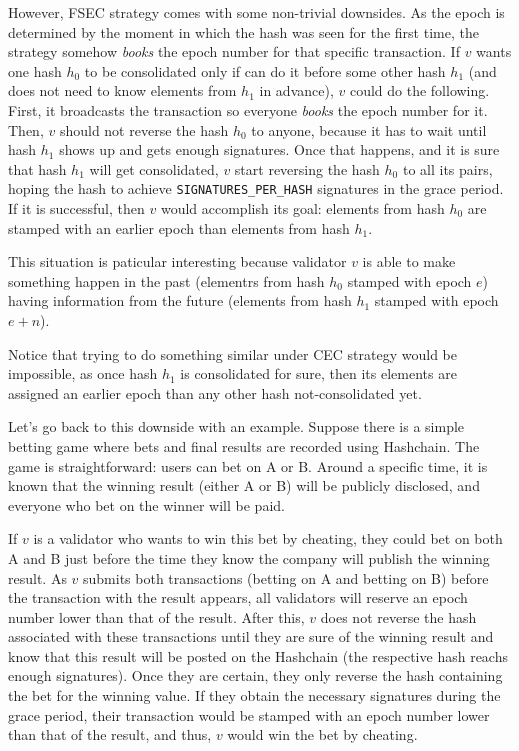 However, FSEC strategy comes with some non-trivial downsides.
As the epoch is determined by the moment in which the hash was seen for the first time,
the strategy somehow \textit{books} the epoch number for that specific transaction.
If $v$ wants one hash $h_0$ to be consolidated only if can do it before some other 
hash $h_1$ (and does not need to know elements from $h_1$ in advance),
$v$ could do the following. First, it broadcasts the transaction so
everyone \textit{books}
the epoch number for it.
Then, $v$ should not reverse the hash $h_0$ to anyone, because it has to wait until hash
$h_1$ shows up and gets enough signatures.
Once that happens, and it is sure that hash
$h_1$ will get consolidated, $v$ start reversing the hash $h_0$ to all its pairs, hoping the
hash to achieve \texttt{SIGNATURES\_PER\_HASH} signatures in the grace period.
If it is successful, then $v$ would accomplish its goal:
elements from hash $h_0$ are stamped with an earlier epoch than elements from
hash $h_1$.

This situation is paticular interesting because validator $v$ is able to make something
happen in the past (elementrs from hash $h_0$ stamped with epoch $e$) having information
from the future (elements from hash $h_1$ stamped with epoch $e+n$).

Notice that trying to do something similar under CEC strategy would be impossible, as once
hash $h_1$ is consolidated for sure, then its elements are assigned an earlier epoch than any
other hash not-consolidated yet.

Let's go back to this downside with an example. Suppose there is a simple betting game where bets and
final results are recorded using Hashchain. The game is straightforward: users can
bet on A or B. Around a specific time, it is known that the winning result (either A or B)
will be publicly disclosed, and everyone who bet on the winner will be paid.

If $v$ is a validator who wants to win this bet by cheating, they could bet on both
A and B just before the time they know the company will publish the winning result.
As $v$ submits both transactions (betting on A and betting on B) before the transaction
with the result appears, all validators will reserve an epoch number lower than that
of the result. After this, $v$ does not reverse the hash associated with these transactions
until they are sure of the winning result and know that this result will be posted on
the Hashchain (the respective hash reachs enough signatures).
Once they are certain, they only reverse the hash containing the bet for
the winning value. If they obtain the necessary signatures during the grace period,
their transaction would be stamped with an epoch number lower than that of the result,
and thus, $v$ would win the bet by cheating.


